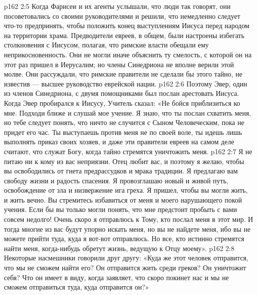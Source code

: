 \vs p162 2:5 Когда Фарисеи и их агенты услышали, что люди так говорят, они посоветовались со своими руководителями и решили, что немедленно следует что\hyp{}то предпринять, чтобы положить конец выступлениям Иисуса перед народом на территории храма. Предводители евреев, в общем, были настроены избегать столкновения с Иисусом, полагая, что римские власти обещали ему неприкосновенность. Они не могли иначе объяснить ту смелость, с которой он на этот раз пришел в Иерусалим; но члены Синедриона не вполне верили этой молве. Они рассуждали, что римские правители не сделали бы этого тайно, не известив --- высшее руководство еврейской нации.
\vs p162 2:6 Поэтому Эвер, один из членов Синедриона, с двумя помощниками был послан арестовать Иисуса. Когда Эвер пробирался к Иисусу, Учитель сказал: «Не бойся приблизиться ко мне. Подходи ближе и слушай мое учение. Я знаю, что ты послан схватить меня, но тебе следует понять, что ничто не случится с Сыном Человеческим, пока не придет его час. Ты выступаешь против меня не по своей воле, ты идешь лишь выполнять приказ своих хозяев, и даже эти правители евреев на самом деле считают, что служат Богу, когда тайно стремятся уничтожить меня.
\vs p162 2:7 Я не питаю ни к кому из вас неприязни. Отец любит вас, и поэтому я желаю, чтобы вы освободились от гнета предрассудков и мрака традиции. Я предлагаю вам свободу жизни и радость спасения. Я провозглашаю новый и живой путь, освобождение от зла и низвержение ига греха. Я пришел, чтобы вы могли жить, и жить вечно. Вы стремитесь избавиться от меня и моего нарушающего покой учения. Если бы вы только могли понять, что мне предстоит пробыть с вами совсем недолго! Очень скоро я отправлюсь к Тому, кто послал меня в этот мир. И тогда многие из вас будут упорно искать меня, но вы не найдете меня, ибо вы не можете прийти туда, куда я вот\hyp{}вот отправлюсь. Но все, кто истинно стремятся найти меня, когда\hyp{}нибудь обретут жизнь, ведущую к Отцу моему».
\vs p162 2:8 Некоторые насмешники говорили друг другу: «Куда же этот человек отправится, что мы не сможем найти его? Он отправится жить среди греков? Он уничтожит себя? Что он имеет в виду, когда заявляет, что скоро покинет нас и мы не сможем отправиться туда, куда отправится он?»
